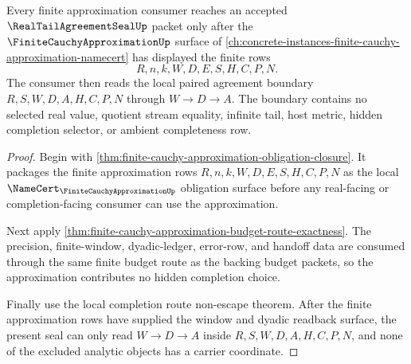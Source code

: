 \begin{theorem}
\label{thm:real-tail-agreement-seal-finite-approximation-consumer-boundary}
Every finite approximation consumer reaches an accepted $\RealTailAgreementSealUp$ packet only after the $\FiniteCauchyApproximationUp$ surface of \autoref{ch:concrete-instances-finite-cauchy-approximation-namecert} has displayed the finite rows
$$
R,n,k,W,D,E,S,H,C,P,N.
$$
The consumer then reads the local paired agreement boundary $R,S,W,D,A,H,C,P,N$ through $W \to D \to A$. The boundary contains no selected real value, quotient stream equality, infinite tail, host metric, hidden completion selector, or ambient completeness row.
\end{theorem}
\begin{proof}
Begin with \autoref{thm:finite-cauchy-approximation-obligation-closure}. It packages the finite approximation rows $R,n,k,W,D,E,S,H,C,P,N$ as the local $\NameCert_{\FiniteCauchyApproximationUp}$ obligation surface before any real-facing or completion-facing consumer can use the approximation.

Next apply \autoref{thm:finite-cauchy-approximation-budget-route-exactness}. The precision, finite-window, dyadic-ledger, error-row, and handoff data are consumed through the same finite budget route as the backing budget packets, so the approximation contributes no hidden completion choice.

Finally use the local completion route non-escape theorem. After the finite approximation rows have supplied the window and dyadic readback surface, the present seal can only read $W \to D \to A$ inside $R,S,W,D,A,H,C,P,N$, and none of the excluded analytic objects has a carrier coordinate.
\end{proof}

